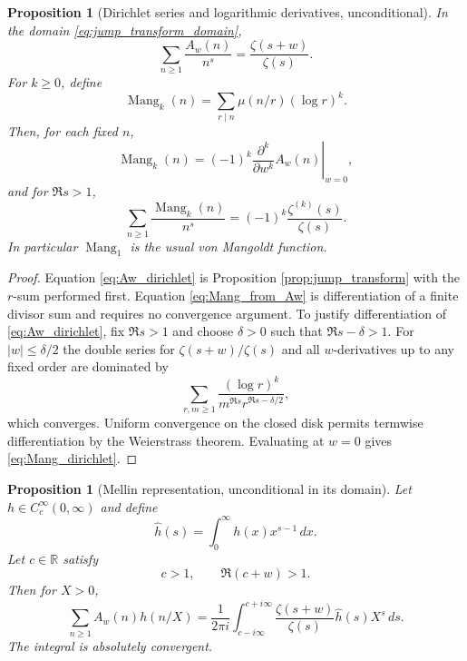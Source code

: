 \documentclass[11pt]{amsart}
\numberwithin{equation}{section}
\theoremstyle{plain}
\newtheorem{proposition}[theorem]{Proposition}
\theoremstyle{definition}
\theoremstyle{remark}
\newcommand{\R}{\mathbb R}
\newcommand{\mob}{\mu}
\begin{document}
\begin{proposition}[Dirichlet series and logarithmic derivatives, unconditional]
\label{prop:Aw}
In the domain \eqref{eq:jump_transform_domain},
\begin{equation}
\sum_{n\ge1}\frac{A_w(n)}{n^s}=\frac{\zeta(s+w)}{\zeta(s)}.
\label{eq:Aw_dirichlet}
\end{equation}
For $k\ge0$, define
\begin{equation}
\operatorname{Mang}_k(n)=\sum_{r\mid n}\mob(n/r)(\log r)^k.
\label{eq:Mang_definition}
\end{equation}
Then, for each fixed $n$,
\begin{equation}
\operatorname{Mang}_k(n)
=(-1)^k\left.\frac{\partial^k}{\partial w^k}A_w(n)\right|_{w=0},
\label{eq:Mang_from_Aw}
\end{equation}
and for $\Re s>1$,
\begin{equation}
\sum_{n\ge1}\frac{\operatorname{Mang}_k(n)}{n^s}
=(-1)^k\frac{\zeta^{(k)}(s)}{\zeta(s)}.
\label{eq:Mang_dirichlet}
\end{equation}
In particular $\operatorname{Mang}_1$ is the usual von Mangoldt function.
\end{proposition}

\begin{proof}
Equation \eqref{eq:Aw_dirichlet} is Proposition \ref{prop:jump_transform} with the $r$-sum performed first.  Equation \eqref{eq:Mang_from_Aw} is differentiation of a finite divisor sum and requires no convergence argument.  To justify differentiation of \eqref{eq:Aw_dirichlet}, fix $\Re s>1$ and choose $\delta>0$ such that $\Re s-\delta>1$.  For $|w|\le\delta/2$ the double series for $\zeta(s+w)/\zeta(s)$ and all $w$-derivatives up to any fixed order are dominated by
\begin{equation}
\sum_{r,m\ge1}\frac{(\log r)^k}{m^{\Re s}r^{\Re s-\delta/2}},
\label{eq:Aw_derivative_domination}
\end{equation}
which converges.  Uniform convergence on the closed disk permits termwise differentiation by the Weierstrass theorem.  Evaluating at $w=0$ gives \eqref{eq:Mang_dirichlet}.
\end{proof}

\begin{proposition}[Mellin representation, unconditional in its domain]
\label{prop:mellin}
Let $h\in C_c^\infty(0,\infty)$ and define
\begin{equation}
\widehat h(s)=\int_0^\infty h(x)x^{s-1}\,dx.
\label{eq:mellin_transform}
\end{equation}
Let $c\in\R$ satisfy
\begin{equation}
c>1,
\qquad
\Re(c+w)>1.
\label{eq:mellin_domain}
\end{equation}
Then for $X>0$,
\begin{equation}
\sum_{n\ge1}A_w(n)h(n/X)
=\frac1{2\pi i}\int_{c-i\infty}^{c+i\infty}
\frac{\zeta(s+w)}{\zeta(s)}\widehat h(s)X^s\,ds.
\label{eq:mellin_representation}
\end{equation}
The integral is absolutely convergent.
\end{proposition}
\end{document}
